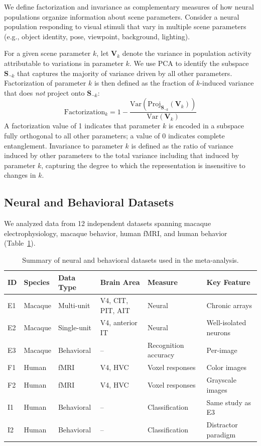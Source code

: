 \documentclass[11pt]{article}
\begin{document}
We define factorization and invariance as complementary measures of how neural populations organize information about scene parameters. Consider a neural population responding to visual stimuli that vary in multiple scene parameters (e.g., object identity, pose, viewpoint, background, lighting).

For a given scene parameter $k$, let $\mathbf{V}_k$ denote the variance in population activity attributable to variations in parameter $k$. We use PCA to identify the subspace $\mathbf{S}_{\neg k}$ that captures the majority of variance driven by all other parameters. Factorization of parameter $k$ is then defined as the fraction of $k$-induced variance that does \emph{not} project onto $\mathbf{S}_{\neg k}$:
\begin{equation}
\text{Factorization}_k = 1 - \frac{\text{Var}(\text{Proj}_{\mathbf{S}_{\neg k}}(\mathbf{V}_k))}{\text{Var}(\mathbf{V}_k)}
\end{equation}
A factorization value of 1 indicates that parameter $k$ is encoded in a subspace fully orthogonal to all other parameters; a value of 0 indicates complete entanglement. Invariance to parameter $k$ is defined as the ratio of variance induced by other parameters to the total variance including that induced by parameter $k$, capturing the degree to which the representation is insensitive to changes in $k$.

\subsection{Neural and Behavioral Datasets}

We analyzed data from 12 independent datasets spanning macaque electrophysiology, macaque behavior, human fMRI, and human behavior (Table~\ref{tab:datasets}).

\begin{table}[htbp]
\centering
\caption{Summary of neural and behavioral datasets used in the meta-analysis.}
\label{tab:datasets}
\begin{tabular}{llllll}
\toprule
ID & Species & Data Type & Brain Area & Measure & Key Feature \\
\midrule
E1 & Macaque & Multi-unit & V4, CIT, PIT, AIT & Neural & Chronic arrays \\
E2 & Macaque & Single-unit & V4, anterior IT & Neural & Well-isolated neurons \\
E3 & Macaque & Behavioral & -- & Recognition accuracy & Per-image \\
F1 & Human & fMRI & V4, HVC & Voxel responses & Color images \\
F2 & Human & fMRI & V4, HVC & Voxel responses & Grayscale images \\
I1 & Human & Behavioral & -- & Classification & Same study as E3 \\
I2 & Human & Behavioral & -- & Classification & Distractor paradigm \\
\bottomrule
\end{tabular}
\end{table}
\end{document}
